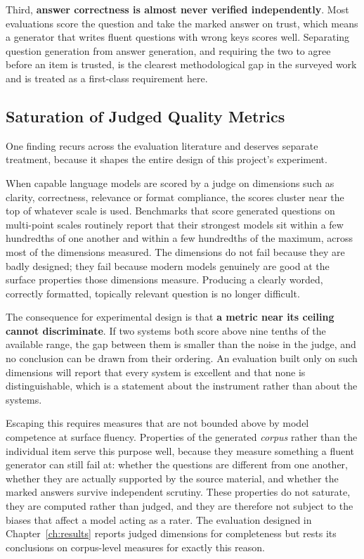 Third, \textbf{answer correctness is almost never verified independently}. Most
evaluations score the question and take the marked answer on trust, which means
a generator that writes fluent questions with wrong keys scores well. Separating
question generation from answer generation, and requiring the two to agree
before an item is trusted, is the clearest methodological gap in the surveyed
work and is treated as a first-class requirement here.

\subsection{Saturation of Judged Quality Metrics}
\label{sec:back-saturation}

One finding recurs across the evaluation literature and deserves separate
treatment, because it shapes the entire design of this project's experiment.

When capable language models are scored by a judge on dimensions such as
clarity, correctness, relevance or format compliance, the scores cluster near
the top of whatever scale is used. Benchmarks that score generated questions on
multi-point scales routinely report that their strongest models sit within a
few hundredths of one another and within a few hundredths of the maximum, across
most of the dimensions measured. The dimensions do not fail because they are
badly designed; they fail because modern models genuinely are good at the
surface properties those dimensions measure. Producing a clearly worded,
correctly formatted, topically relevant question is no longer difficult.

The consequence for experimental design is that \textbf{a metric near its
ceiling cannot discriminate}. If two systems both score above nine tenths of the
available range, the gap between them is smaller than the noise in the judge,
and no conclusion can be drawn from their ordering. An evaluation built only on
such dimensions will report that every system is excellent and that none is
distinguishable, which is a statement about the instrument rather than about
the systems.

Escaping this requires measures that are not bounded above by model competence
at surface fluency. Properties of the generated \emph{corpus} rather than the
individual item serve this purpose well, because they measure something a fluent
generator can still fail at: whether the questions are different from one
another, whether they are actually supported by the source material, and whether
the marked answers survive independent scrutiny. These properties do not
saturate, they are computed rather than judged, and they are therefore not
subject to the biases that affect a model acting as a rater. The evaluation
designed in Chapter~\ref{ch:results} reports judged dimensions for completeness
but rests its conclusions on corpus-level measures for exactly this reason.
